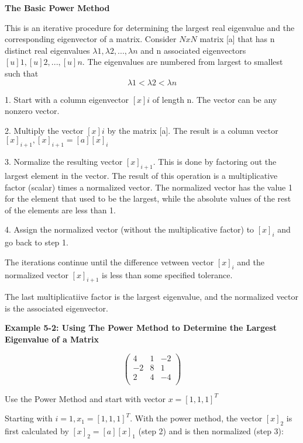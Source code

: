 \documentclass{article}
\begin{document}
\textbf{The Basic Power Method}

This is an iterative procedure for determining the largest real eigenvalue and the corresponding eigenvector of a matrix. Consider $N x N$ matrix [a] that has n distinct real eigenvalues \(\lambda 1, \lambda 2, ..., \lambda n\) and n associated eigenvectors \([u]1,[u]2, ..., [u]n\). The eigenvalues are numbered from largest to smallest such that  \[\lambda 1 < \lambda 2 < \lambda n\]

1. Start with a column eigenvector $[x]i$ of length n. The vector can be any nonzero vector.

2. Multiply the vector $[x]i$ by the matrix [a]. The result is a column vector$[x]_{i+1}, [x]_{i+1} = [a][x]_i$

3.  Normalize the resulting vector $[x]_{i+1}$. This is done by factoring out the largest element in the vector. The result of this operation is a multiplicative factor (scalar) times a normalized vector. The normalized vector has the value 1 for the element that used to be the largest, while the absolute values of the rest of the elements are less than 1. 

4. Assign the normalized vector (without the multiplicative factor) to $[x]_i$ and go back to step 1. 

The iterations continue until the difference vetween vector $[x]_i$ and the normalized vector $[x]_{i+1}$ is less than some specified tolerance.

The last multiplicatiive factor is the largest eigenvalue, and the normalized vector is the associated eigenvector.

\textbf{Example 5-2: Using The Power Method to Determine the Largest Eigenvalue of a Matrix}

\begin{equation*}
\begin{pmatrix}
4 & 1 & -2 \\
-2 & 8 & 1 \\
2 & 4 & -4 \\
\end{pmatrix}
\end{equation*}

Use the Power Method and start with vector $x = [1, 1, 1]^T$

Starting with $i = 1, x_1 = [1, 1, 1]^T$. With the power method, the vector $[x]_2$ is first calculated by $[x]_2 = [a][x]_1$ (step 2) and is then normalized (step 3):
\end{document}
